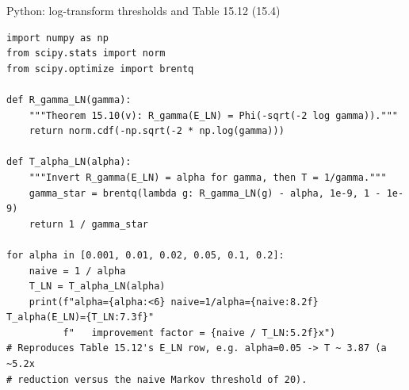 \documentclass[aspectratio=169,10pt]{beamer}
\begin{document}
\begin{frame}[fragile]{Python: log-transform thresholds and Table 15.12 (15.4)}
  \begin{lstlisting}
import numpy as np
from scipy.stats import norm
from scipy.optimize import brentq

def R_gamma_LN(gamma):
    """Theorem 15.10(v): R_gamma(E_LN) = Phi(-sqrt(-2 log gamma))."""
    return norm.cdf(-np.sqrt(-2 * np.log(gamma)))

def T_alpha_LN(alpha):
    """Invert R_gamma(E_LN) = alpha for gamma, then T = 1/gamma."""
    gamma_star = brentq(lambda g: R_gamma_LN(g) - alpha, 1e-9, 1 - 1e-9)
    return 1 / gamma_star

for alpha in [0.001, 0.01, 0.02, 0.05, 0.1, 0.2]:
    naive = 1 / alpha
    T_LN = T_alpha_LN(alpha)
    print(f"alpha={alpha:<6} naive=1/alpha={naive:8.2f}   T_alpha(E_LN)={T_LN:7.3f}"
          f"   improvement factor = {naive / T_LN:5.2f}x")
# Reproduces Table 15.12's E_LN row, e.g. alpha=0.05 -> T ~ 3.87 (a ~5.2x
# reduction versus the naive Markov threshold of 20).
  \end{lstlisting}
\end{frame}
\end{document}
